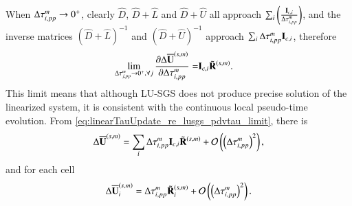 When $\mathrm\Delta\tau^m_{i,pp}\rightarrow 0^+$, clearly 
$\hat D $, $\hat D + \hat L$ and $\hat D + \hat U$ all 
approach
$\sum_i\left(\frac{\mathbf{I}_{c,i}}{\mathrm\Delta \tau^m_{i,pp}}\right) $,
and the inverse matrices  $(\hat D + \hat L)^{-1}$ and 
$(\hat D + \hat U)^{-1}$ approach $\sum_i\mathrm\Delta\tau^m_{i,pp}\mathbf{I}_{c,i}$,
therefore
\begin{equation}
    \begin{aligned}
       \lim_{\mathrm\Delta\tau^m_{j,pp}\rightarrow 0^+, \forall j}\pdv{\mathrm\Delta\overline{\mathbf{U}}^{\left(s,m\right)}}{\mathrm\Delta\tau^m_{i,pp}}
    = & \mathbf{I}_{c,i}
    \tilde{\mathbf{R}}^{\left(s,m\right)}.
    \end{aligned}
    \label{eq:linearTauUpdate_re_lusgs_pdvtau_limit}
\end{equation}
This limit means that although LU-SGS does not 
produce precise solution of the linearized system, 
it is consistent with the continuous local pseudo-time evolution. 
From \eqref{eq:linearTauUpdate_re_lusgs_pdvtau_limit},
there is 
\begin{equation}
    \mathrm\Delta \overline{\mathbf{U}}^{\left(s,m\right)}
    =
    \sum_i{\mathrm\Delta\tau^m_{i,pp}\mathbf{I}_{c,i}} \tilde{\mathbf{R}}^{\left(s,m\right)}
    +
    \mathcal{O}\left(\left(\mathrm\Delta\tau^m_{i,pp}\right)^2\right),
\end{equation}
and for each cell
\begin{equation}
\label{eq:linearTauUpdate_lusgs_expand_tau}
    \mathrm\Delta \overline{\mathbf{U}}^{\left(s,m\right)}_i
    =
    \mathrm\Delta\tau^m_{i,pp}
    \tilde{\mathbf{R}}^{\left(s,m\right)}_i
    +
    \mathcal{O}\left(\left(\mathrm\Delta\tau^m_{i,pp}\right)^2\right).
\end{equation}


